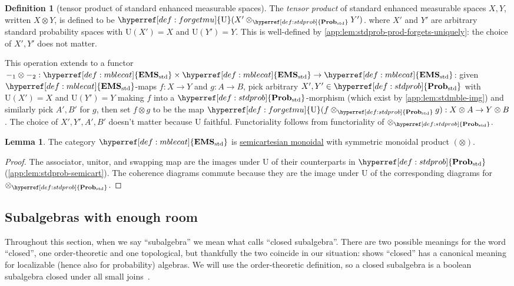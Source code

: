 \documentclass[
  sigconf,
  screen, ]{acmart}
\theoremstyle{definition}
\newtheorem{lemma}[theorem]{Lemma}
\newtheorem{definition}[theorem]{Definition}
\newcommand\fremlinft[3]{\citet[\href{https://www1.essex.ac.uk/maths/people/fremlin/chap#2.pdf\#page=#3}{#1}]{fremlin2000measure}}
\newcommand\fremlinf[3]{\cite[\href{https://www1.essex.ac.uk/maths/people/fremlin/chap#2.pdf\#page=#3}{#1}]{fremlin2000measure}}
\newcommand\nref[2]{\hyperref[#1]{#2}} \newcommand\checkhigh{{\huge{\color{red}\textbf{TODO: check}}}}
\newcommand\texforgetmu{\mathrm{U}}
\newcommand\forgetmu{{\nref{def:forgetmu}{\texforgetmu}}}
\newcommand\texStdProb{\mathbf{Prob}_{\rm std}}
\newcommand\StdProb{{\nref{def:stdprob}{\texStdProb}}}
\newcommand\texStdMble{\mathbf{EMS}_{\rm std}}
\newcommand\StdMble{{\nref{def:mblecat}{\texStdMble}}}
\begin{document}
\begin{definition}[tensor product of standard enhanced measurable spaces] \label{app:def:stdmble-tensor}
  The \emph{tensor product}
  of standard enhanced measurable spaces $X,Y$,
  written $X\otimes Y$, is defined to be
  $\forgetmu (X'\otimes_{\StdProb} Y')$.
  where
  $X'$ and $Y'$ are arbitrary standard probability spaces
  with $\forgetmu (X') = X$ and $\forgetmu (Y') = Y$.
  This is well-defined by 
  \cref{app:lem:stdprob-prod-forgets-uniquely}: the choice of
  $X',Y'$ does not matter.

  This operation extends to a functor $-_1\otimes -_2 : \StdMble\times\StdMble\to\StdMble$:
  given $\StdMble$-maps $f : X\to Y$ and $g : A\to B$,
  pick arbitrary $X',Y'\in\StdProb$ with $\forgetmu (X') = X$ and $\forgetmu (Y') = Y$
  making $f$ into a $\StdProb$-morphism
  (which exist by \cref{app:lem:stdmble-img})
  and similarly pick $A',B'$ for $g$,
  then set $f\otimes g$ to be the map $\forgetmu (f\otimes_{\StdProb} g) : X\otimes A\to Y\otimes B$.
  The choice of $X',Y',A',B'$ doesn't matter because $\forgetmu$ faithful.
  Functoriality follows from functoriality of $\otimes_{\StdProb}$.
\end{definition}

\begin{lemma} \label{app:lem:stdmble-semicartesian}
  The category $\StdMble$
  is \nref{app:def:semicartesian-monoidal-category}{semicartesian monoidal}
  with symmetric monoidal product $\nref{app:def:stdmble-tensor}{(\otimes)}$.
\end{lemma}
\begin{proof}
  The associator, unitor, and swapping map are
  the images under $\forgetmu$ of their counterparts
  in $\StdProb$ (\cref{app:lem:stdprob-semicart}).
  The coherence diagrams commute because
  they are the image under $\forgetmu$ of
  the corresponding diagrams for $\otimes_{\StdProb}$.
\end{proof}

\subsection{Subalgebras with enough room} \label{app:sec:subalgebras-with-enough-room}

Throughout this section,
when we say ``subalgebra'' we mean what \citet{fremlin2000measure}
calls ``closed subalgebra''.
There are two possible meanings for the word ``closed'',
one order-theoretic and one topological, but thankfully the
two coincide in our situation: \fremlinft{323H}{32}{19}
shows ``closed'' has a
canonical meaning for localizable (hence also for probability) algebras.
We will use the order-theoretic definition, so a closed subalgebra
is a boolean subalgebra closed under all small joins~\fremlinf{313D(a)}{31}{22}.
\end{document}
